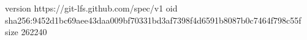 version https://git-lfs.github.com/spec/v1
oid sha256:9452d1bc69aee43daa009bf70331bd3af7398f4d6591b8087b0c7464f798c55f
size 262240
